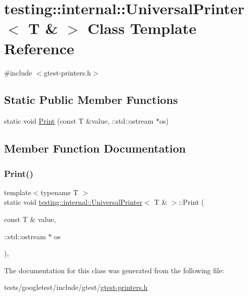\hypertarget{classtesting_1_1internal_1_1UniversalPrinter_3_01T_01_6_01_4}{}\section{testing\+:\+:internal\+:\+:Universal\+Printer$<$ T \& $>$ Class Template Reference}
\label{classtesting_1_1internal_1_1UniversalPrinter_3_01T_01_6_01_4}


{\ttfamily \#include $<$gtest-\/printers.\+h$>$}

\subsection*{Static Public Member Functions}
\begin{DoxyCompactItemize}
\item 
static void \hyperlink{classtesting_1_1internal_1_1UniversalPrinter_3_01T_01_6_01_4_a923a694be8aa66117848c1c5f57ede35}{Print} (const T \&value, \+::std\+::ostream $\ast$os)
\end{DoxyCompactItemize}


\subsection{Member Function Documentation}
\mbox{\label{classtesting_1_1internal_1_1UniversalPrinter_3_01T_01_6_01_4_a923a694be8aa66117848c1c5f57ede35}} 
\subsubsection{\texorpdfstring{Print()}{Print()}}
{\footnotesize\ttfamily template$<$typename T $>$ \\
static void \hyperlink{classtesting_1_1internal_1_1UniversalPrinter}{testing\+::internal\+::\+Universal\+Printer}$<$ T \& $>$\+::Print (\begin{DoxyParamCaption}\item[{const T \&}]{value,  }\item[{\+::std\+::ostream $\ast$}]{os }\end{DoxyParamCaption})\hspace{0.3cm}{\ttfamily [inline]}, {\ttfamily [static]}}



The documentation for this class was generated from the following file\+:\begin{DoxyCompactItemize}
\item 
tests/googletest/include/gtest/\hyperlink{gtest-printers_8h}{gtest-\/printers.\+h}\end{DoxyCompactItemize}
